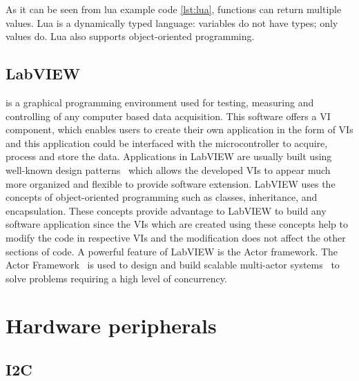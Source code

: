 


	
As it can be seen from lua example code \cref{lst:lua}, functions can return multiple values.
Lua is a dynamically typed language: variables do not have types; only values do.
Lua also supports object-oriented programming.  
	
	\subsection{LabVIEW}
 is a graphical programming environment used for testing, measuring and controlling of any computer based data acquisition.
This software offers a \gls{VI} component, which enables users to create their own application in the form of \gls{VI}s and this application could be interfaced with the microcontroller to acquire, process and store the data. 
Applications in LabVIEW are usually built using well-known design patterns~\cite{Gamma1994a} which allows the developed \gls{VI}s to appear much more organized and flexible to provide software extension.
LabVIEW uses the concepts of object-oriented programming such as classes, inheritance, and encapsulation. These concepts provide advantage to LabVIEW to build any software application since the \gls{VI}s which are created using these concepts help to modify the code in respective VIs and the modification does not affect the other sections of code.
A powerful feature of LabVIEW is the Actor framework.
The Actor Framework~\cite{ActorFramework2012,Mercer2011} is used to design and build scalable multi-actor systems~\cite{Hewitt2015a} to solve problems requiring a high level of concurrency. 

\section{Hardware peripherals}

\subsection{I2C}\label{sec:IIC}

